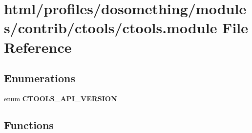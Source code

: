 \hypertarget{ctools_8module}{
\section{html/profiles/dosomething/modules/contrib/ctools/ctools.module File Reference}
\label{ctools_8module}
}
\subsection*{Enumerations}
\begin{DoxyCompactItemize}
\item 
enum {\bfseries CTOOLS\_\-API\_\-VERSION} 
\end{DoxyCompactItemize}
\subsection*{Functions}

